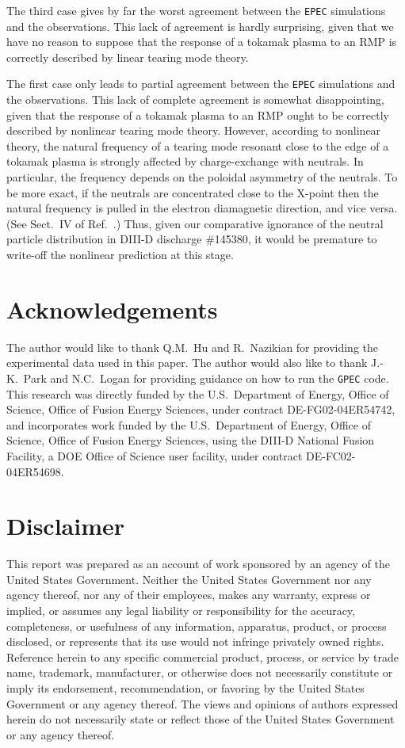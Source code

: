 \documentclass[12pt,prb,aps]{revtex4-1}
\begin{document}
 The third case gives by far the worst agreement between the {\tt EPEC} simulations and the  observations. This lack of agreement is hardly surprising, given
that we have no reason to suppose that the response of a tokamak plasma to an RMP is correctly described by linear tearing mode theory.\cite{rf1} 

The first case only leads to partial agreement between  the {\tt EPEC} simulations and the  observations. This lack of complete agreement is somewhat
disappointing, given that the response of a tokamak plasma to an RMP ought to be correctly described by nonlinear tearing mode theory. However, according to
nonlinear theory, the natural frequency of a tearing mode resonant close to the edge of a tokamak plasma is strongly affected by charge-exchange with neutrals.\cite{rf2}
In particular, the frequency depends on the poloidal asymmetry of the neutrals. To be more exact, if the neutrals are concentrated close to the X-point then the
natural frequency is pulled in the electron diamagnetic direction, and vice versa.\cite{rf2} (See Sect.~IV of Ref.~.) Thus, given our comparative ignorance of the neutral particle
distribution in DIII-D discharge \#145380, it would be premature to write-off the nonlinear prediction at this stage.  

\section*{Acknowledgements}
The author would like to thank Q.M.~Hu and R.~Nazikian for providing the experimental data used in this paper. The
author would also like to thank J.-K.~Park and N.C.~Logan for providing guidance on how to run the {\tt GPEC} code.
This research was directly funded by the U.S.\ Department of Energy, Office of Science, Office of Fusion Energy Sciences,  under contract DE-FG02-04ER54742, and
incorporates work funded by the U.S.\ Department of Energy, Office of Science, Office of Fusion Energy Sciences, using the DIII-D National Fusion Facility, a DOE Office of Science user facility, under contract DE-FC02-04ER54698.  

\section*{Disclaimer} This report was prepared as an account of work sponsored by an agency of the United States Government. Neither the United States Government nor any agency thereof, nor any of their employees, makes any warranty, express or implied, or assumes any legal liability or responsibility for the accuracy, completeness, or usefulness of any information, apparatus, product, or process disclosed, or represents that its use would not infringe privately owned rights. Reference herein to any specific commercial product, process, or service by trade name, trademark, manufacturer, or otherwise does not necessarily constitute or imply its endorsement, recommendation, or favoring by the United States Government or any agency thereof. The views and opinions of authors expressed herein do not necessarily state or reflect those of the United States Government or any agency thereof. 
 
\end{document}
